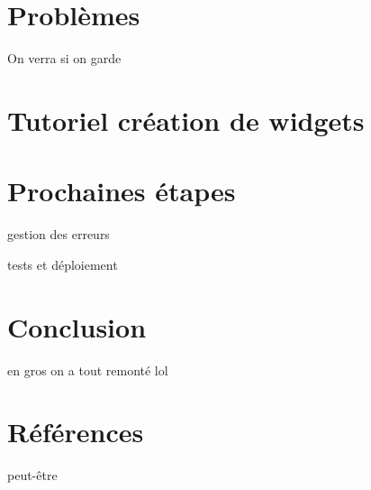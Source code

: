 \documentclass{article}
\begin{document}
\section{Problèmes}

On verra si on garde

\section{Tutoriel création de widgets}

\section{Prochaines étapes}

gestion des erreurs

tests et déploiement

\section{Conclusion}
en gros on a tout remonté lol

\section{Références}

peut-être
\end{document}
